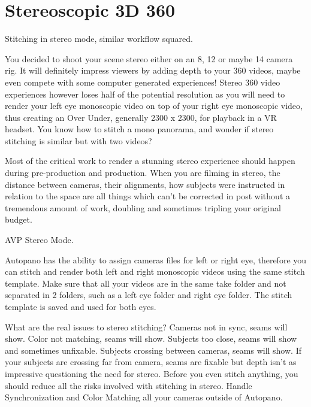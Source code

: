 \chapter{Stereoscopic 3D 360}
\pagecolor{white}
\label{chap:42}
\begin{fullwidth}

\problem

{\large Stitching in stereo mode, similar workflow squared. \par}

You decided to shoot your scene stereo either on an 8, 12 or maybe 14 camera rig. It will definitely impress viewers by adding depth to your 360 videos, maybe even compete with some computer generated experiences! Stereo 360 video experiences however loses half of the potential resolution as you will need to render your left eye monoscopic video on top of your right eye monoscopic video, thus creating an Over Under, generally 2300 x 2300, for playback in a VR headset. You know how to stitch a mono panorama, and wonder if stereo stitching is similar but with two videos?

\solution

Most of the critical work to render a stunning stereo experience should happen during pre-production and production. When you are filming in stereo, the distance between cameras, their alignments, how subjects were instructed in relation to the space are all things which can’t be corrected in post without a tremendous amount of work, doubling and sometimes tripling your original budget. 

{\large AVP Stereo Mode. \par}

Autopano has the ability to assign cameras files for left or right eye, therefore you can stitch and render both left and right monoscopic videos using the same stitch template. Make sure that all your videos are in the same take folder and not separated in 2 folders, such as a left eye folder and right eye folder. The stitch template is saved and used for both eyes. 


What are the real issues to stereo stitching? Cameras not in sync, seams will show. Color not matching, seams will show. Subjects too close, seams will show and sometimes unfixable. Subjects crossing between cameras, seams will show. If your subjects are crossing far from camera, seams are fixable but depth isn’t as impressive questioning the need for stereo. Before you even stitch anything, you should reduce all the risks involved with stitching in stereo. Handle Synchronization and Color Matching all your cameras outside of Autopano.


\end{fullwidth}
